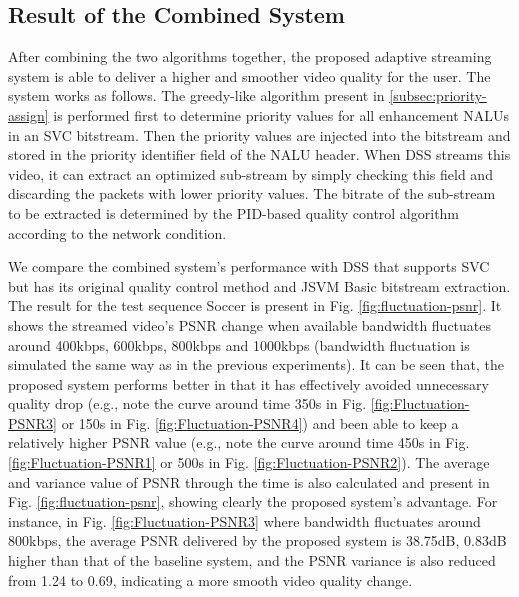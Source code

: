 \documentclass[journal]{IEEEtran}
\begin{document}
\subsection{Result of the Combined System}
\label{subsec:exp-combined}

After combining the two algorithms together, the proposed adaptive streaming system is able to deliver a higher and smoother video quality for the user. The system works as follows. The greedy-like algorithm present in \ref{subsec:priority-assign} is performed first to determine priority values for all enhancement NALUs in an SVC bitstream. Then the priority values are injected into the bitstream and stored in the priority identifier field of the NALU header. When DSS streams this video, it can extract an optimized sub-stream by simply checking this field and discarding the packets with lower priority values. The bitrate of the sub-stream to be extracted is determined by the PID-based quality control algorithm according to the network condition.

We compare the combined system's performance with DSS that supports SVC but has its original quality control method and JSVM Basic bitstream extraction. The result for the test sequence Soccer is present in Fig. \ref{fig:fluctuation-psnr}. It shows the streamed video's PSNR change when available bandwidth fluctuates around 400kbps, 600kbps, 800kbps and 1000kbps (bandwidth fluctuation is simulated the same way as in the previous experiments). It can be seen that, the proposed system performs better in that it has effectively avoided unnecessary quality drop (e.g., note the curve around time 350s in Fig. \ref{fig:Fluctuation-PSNR3} or 150s in Fig. \ref{fig:Fluctuation-PSNR4}) and been able to keep a relatively higher PSNR value (e.g., note the curve around time 450s in Fig. \ref{fig:Fluctuation-PSNR1} or 500s in Fig. \ref{fig:Fluctuation-PSNR2}). The average and variance value of PSNR through the time is also calculated and present in Fig. \ref{fig:fluctuation-psnr}, showing clearly the proposed system's advantage. For instance, in Fig. \ref{fig:Fluctuation-PSNR3} where bandwidth fluctuates around 800kbps, the average PSNR delivered by the proposed system is 38.75dB, 0.83dB higher than that of the baseline system, and the PSNR variance is also reduced from 1.24 to 0.69, indicating a more smooth video quality change.
\end{document}
